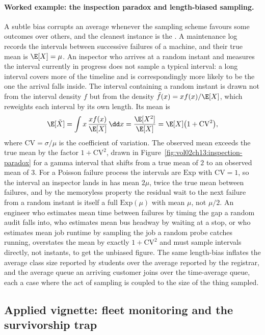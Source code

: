 \paragraph{Worked example: the inspection paradox and length-biased
sampling.} A subtle bias corrupts an average whenever the sampling scheme
favours some outcomes over others, and the cleanest instance is the
. A maintenance log records the intervals
between successive failures of a machine, and their true mean is $\E[X] =
\mu$. An inspector who arrives at a random instant and measures the
interval currently in progress does not sample a typical interval: a long
interval covers more of the timeline and is correspondingly more likely
to be the one the arrival falls inside. The interval containing a random
instant is drawn not from the interval density $f$ but from the
 density $\tilde f(x) = x f(x)/\E[X]$, which
reweights each interval by its own length. Its mean is
\[
\E[\tilde X] = \int x\,\frac{x f(x)}{\E[X]}\,\dd x
= \frac{\E[X^{2}]}{\E[X]}
= \E[X]\big(1 + \mathrm{CV}^{2}\big),
\]
where $\mathrm{CV} = \sigma/\mu$ is the coefficient of variation. The
observed mean exceeds the true mean by the factor $1 + \mathrm{CV}^{2}$,
drawn in Figure~\ref{fig:vol02ch13:inspection-paradox} for a gamma
interval that shifts from a true mean of $2$ to an observed mean of $3$.
For a Poisson failure process the intervals are $\mathrm{Exp}$ with
$\mathrm{CV} = 1$, so the interval an inspector lands in has mean $2\mu$,
twice the true mean between failures, and by the memoryless property the
residual wait to the next failure from a random instant is itself a full
$\mathrm{Exp}(\mu)$ with mean $\mu$, not $\mu/2$. An engineer who
estimates mean time between failures by timing the gap a random audit
falls into, who estimates mean bus headway by waiting at a stop, or who
estimates mean job runtime by sampling the job a random probe catches
running, overstates the mean by exactly $1 + \mathrm{CV}^{2}$ and must
sample intervals directly, not instants, to get the unbiased figure. The
same length-bias inflates the average class size reported by students
over the average reported by the registrar, and the average queue an
arriving customer joins over the time-average queue, each a case where
the act of sampling is coupled to the size of the thing sampled.



\subsection{Applied vignette: fleet monitoring and the survivorship trap}

